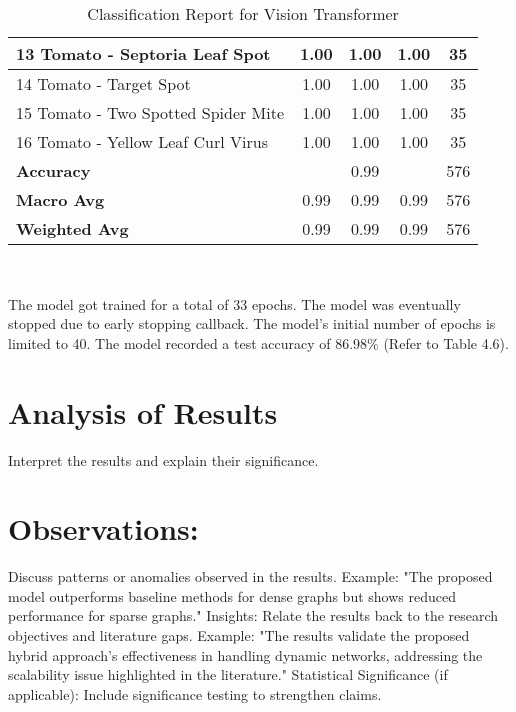 \begin{table}[h!]
{\begin{tabular}{|l|c|c|c|c|}
    13 Tomato - Septoria Leaf Spot                    & 1.00               & 1.00            & 1.00              & 35               \\ \hline
    14 Tomato - Target Spot                           & 1.00               & 1.00            & 1.00              & 35               \\ \hline
    15 Tomato - Two Spotted Spider Mite               & 1.00               & 1.00            & 1.00              & 35               \\ \hline
    16 Tomato - Yellow Leaf Curl Virus                & 1.00               & 1.00            & 1.00              & 35               \\ \hline
    \textbf{Accuracy}                                 & \multicolumn{3}{c|}{0.99}            & 576              \\ \hline
    \textbf{Macro Avg}                                & 0.99               & 0.99            & 0.99              & 576              \\ \hline
    \textbf{Weighted Avg}                             & 0.99               & 0.99            & 0.99              & 576              \\ \hline
    \end{tabular}%
    }
    \caption{Classification Report for Vision Transformer}
    \label{tab:classification_report}
\end{table}
    
\

The model got trained for a total of 33 epochs. The model was eventually stopped due to early stopping callback. The model's initial number of epochs is limited to 40. The model recorded a test accuracy of 86.98\% (Refer to Table 4.6).

\section{ Analysis of Results}
 Interpret the results and explain their significance.

\section{Observations:} Discuss patterns or anomalies observed in the results.
Example: "The proposed model outperforms baseline methods for dense graphs but shows reduced performance for sparse graphs."
Insights: Relate the results back to the research objectives and literature gaps.
Example: "The results validate the proposed hybrid approach's effectiveness in handling dynamic networks, addressing the scalability issue highlighted in the literature."
Statistical Significance (if applicable): Include significance testing to strengthen claims.
